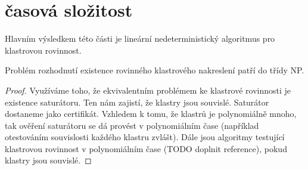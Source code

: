 \section{časová složitost}
Hlavním výsledkem této části je lineární nedeterministický algoritmus pro klastrovou rovinnost.
\begin{tvr}
Problém rozhodnutí existence rovinného klastrového nakreslení patří do třídy NP.
\end{tvr}
\begin{proof}
Využíváme toho, že ekvivalentním problémem ke klastrové rovinnosti je existence saturátoru. Ten nám zajistí, že klastry jsou souvislé. Saturátor dostaneme jako certifikát. Vzhledem k tomu, že klastrů je polynomiálně mnoho, tak ověření saturátoru se dá provést  v polynomiálním čase (například otestováním souvislosti každého klastru zvlášt). Dále jsou algoritmy testující klastrovou rovinnost v polynomiálním čase (TODO doplnit reference), pokud klastry jsou souvislé. 
\end{proof}

